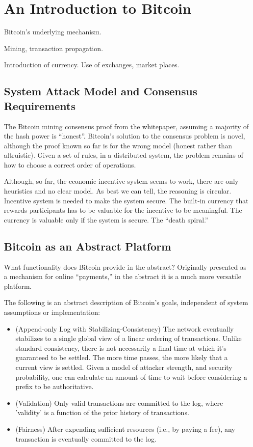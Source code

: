 \section{An Introduction to Bitcoin}

Bitcoin's underlying mechanism.

Mining, transaction propagation.

Introduction of currency. Use of exchanges, market places.

\subsection{System Attack Model and Consensus Requirements}

The Bitcoin mining consensus proof from the whitepaper, assuming a majority of the hash power is ``honest''. Bitcoin's solution to the consensus problem is novel, although the proof known so far is for the wrong model (honest rather than altruistic). Given a set of rules, in a distributed system, the problem remains of how to choose a correct order of operations.

Although, so far, the economic incentive system seems to work, there are only heuristics and no clear model. As best we can tell, the reasoning is circular. Incentive system is needed to make the system secure. The built-in currency that rewards participants has to be valuable for the incentive to be meaningful. The currency is valuable only if the system is secure. The ``death spiral.''

\subsection{Bitcoin as an Abstract Platform}

What functionality does Bitcoin provide in the abstract? Originally presented as a mechanism for online ``payments,'' in the abstract it is a much more versatile platform.

The following is an abstract description of Bitcoin's goals, independent of system assumptions or implementation:
\begin{itemize}
\item (Append-only Log with Stabilizing-Consistency) The network eventually stabilizes to a single global view of a linear ordering of transactions. Unlike standard consistency, there is not necessarily a final time at which it's guaranteed to be settled. The more time passes, the more likely that a current view is settled. Given a model of attacker strength, and security probability, one can calculate an amount of time to wait before considering a prefix to be authoritative.
\item (Validation) Only valid transactions are committed to the log, where 'validity' is a function of the prior history of transactions.
\item (Fairness) After expending sufficient resources (i.e., by paying a fee), any transaction is eventually committed to the log.
\end{itemize}

